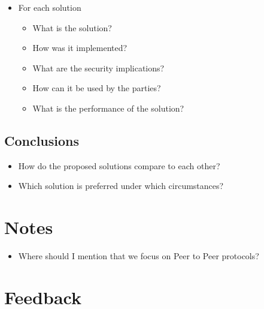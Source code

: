\begin{itemize}
\tightlist
\item
  For each solution

  \begin{itemize}
  \tightlist
  \item
    What is the solution?
  \item
    How was it implemented?
  \item
    What are the security implications?
  \item
    How can it be used by the parties?
  \item
    What is the performance of the solution?
  \end{itemize}
\end{itemize}

\hypertarget{conclusions}{%
\section{Conclusions}\label{conclusions}}

\begin{itemize}
\tightlist
\item
  How do the proposed solutions compare to each other?
\item
  Which solution is preferred under which circumstances?
\end{itemize}

\hypertarget{notes}{%
\chapter{Notes}\label{notes}}

\begin{itemize}
\tightlist
\item
  Where should I mention that we focus on Peer to Peer protocols?
\end{itemize}

\hypertarget{feedback}{%
\chapter{Feedback}\label{feedback}}

